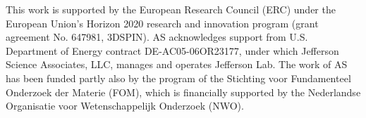 \documentclass[aps,preprintnumbers,showpacs,nofootinbib,superscriptaddress,floatfix]{revtex4}
\begin{document}
\begin{acknowledgments}
This work is supported by the European Research Council (ERC) under the European Union's Horizon 2020 research and innovation program (grant agreement No. 647981, 3DSPIN). 
AS acknowledges support from U.S. Department of Energy contract DE-AC05-06OR23177, under which Jefferson Science Associates, LLC, manages and operates Jefferson Lab. 
The work of AS has been funded partly also by the program of the Stichting voor Fundamenteel Onderzoek der Materie (FOM), which is financially supported by the Nederlandse Organisatie voor Wetenschappelijk Onderzoek (NWO).
\end{acknowledgments}
%
%

%

%
%
\end{document}
